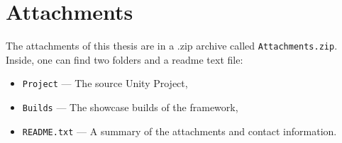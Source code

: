 \chapter{Attachments}

The attachments of this thesis are in a .zip archive called \verb|Attachments.zip|. Inside, one can find two folders and a readme text file: 
\begin{itemize}
    \item     \verb|Project| — The source Unity Project,
    \item \verb|Builds| — The showcase builds of the framework,
    \item \verb|README.txt| — A summary of the attachments and contact information.
\end{itemize}